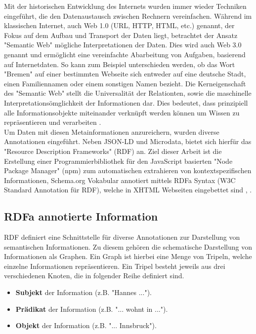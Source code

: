 \documentclass[hidelinks, a4paper, 11pt]{article} %
\begin{document}
Mit der historischen Entwicklung des Internets wurden immer wieder Techniken eingef\"uhrt, die den Datenaustausch zwischen Rechnern vereinfachen. W\"ahrend im klassischen Internet, auch Web 1.0 (URL, HTTP, HTML, etc.) genannt, der Fokus auf dem Aufbau und Transport der Daten liegt, betrachtet der Ansatz "Semantic Web" m\"ogliche Interpretationen der Daten. Dies wird auch Web 3.0 genannt und erm\"oglicht eine vereinfachte Abarbeitung von Aufgaben, basierend auf Internetdaten. So kann zum Beispiel unterschieden werden, ob das Wort "Bremen" auf einer bestimmten Webseite sich entweder auf eine deutsche Stadt, einen Familiennamen oder einem sonstigen Namen bezieht. Die Kerneigenschaft des "Semantic Web" stellt die Universalit\"at der Relationten, sowie die maschinelle Interpretations\"omglichkeit der Informationen dar. Dies bedeutet, dass prinzipiell alle Informationsobjekte miteinander verkn\"upft werden k\"onnen um Wissen zu repr\"asentieren und verarbeiten \cite{berners2001semantic}. \\

Um Daten mit diesen Metainformationen anzureichern, wurden diverse Annotationen eingef\"uhrt. Neben JSON-LD und Microdata, bietet sich hierf\"ur das "Resource Description Frameworks" (RDF) an. Ziel dieser Arbeit ist die Erstellung einer Programmierbibliothek f\"ur den JavaScript basierten "Node Package Manager" (npm) zum automatischen extrahieren von kontextspezifischen Informationen, Schema.org Vokabular annotiert mittels RDFa Syntax (W3C Standard Annotation f\"ur RDF), welche in XHTML Webseiten eingebettet sind \cite{guha2016schema}, \cite{halb2008building}.

\subsection{RDFa annotierte Information}

RDF definiert eine Schnittstelle f\"ur diverse Annotationen zur Darstellung von semantischen Informationen. Zu diesem geh\"oren die schematische Darstellung von Informationen als Graphen. Ein Graph ist hierbei eine Menge von Tripeln, welche einzelne Informationen repr\"asentieren. Ein Tripel besteht jeweils aus drei verschiedenen Knoten, die in folgender Reihe definiert sind. 

\begin{itemize}
\item \textbf{Subjekt} der Information (z.B. "Hannes ...").
\item \textbf{Pr\"adikat} der Information (z.B. "... wohnt in ...").
\item \textbf{Objekt} der Information (z.B. "... Innsbruck").
\end{itemize}
\end{document}
